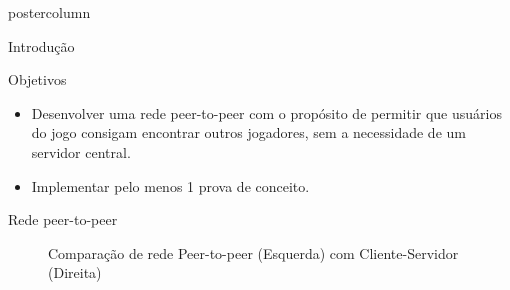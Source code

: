 \documentclass[final]{beamer}
\begin{document}
\begin{frame}
\begin{columns}
\begin{column}{.5\textwidth}
\begin{beamercolorbox}[center,wd=\textwidth]{postercolumn}
\begin{minipage}[T]{.95\textwidth}
{\begin{block}{Introdução}
                \vspace*{0.2cm}
            \end{block}
            
            \vspace*{0.2cm}

            \begin{block}{Objetivos}
              \justifying
              \begin{itemize}
                \item Desenvolver uma rede peer-to-peer com o propósito de permitir que usuários do jogo consigam encontrar outros jogadores,
                sem a necessidade de um servidor central. 
                
                \vspace*{0.4cm}
                
                \item Implementar pelo menos 1 prova de conceito.
              \end{itemize}
              \vspace*{0.2cm} 
            \end{block}
            
            \vspace*{0.2cm}
            
            \begin{block}{Rede peer-to-peer}
                \justifying 
                \begin{figure}[h]
                  \caption{Comparação de rede Peer-to-peer (Esquerda) com Cliente-Servidor (Direita)}
                \end{figure}
                

\end{block}}
\end{minipage}
\end{beamercolorbox}
\end{column}
\end{columns}
\end{frame}
\end{document}
